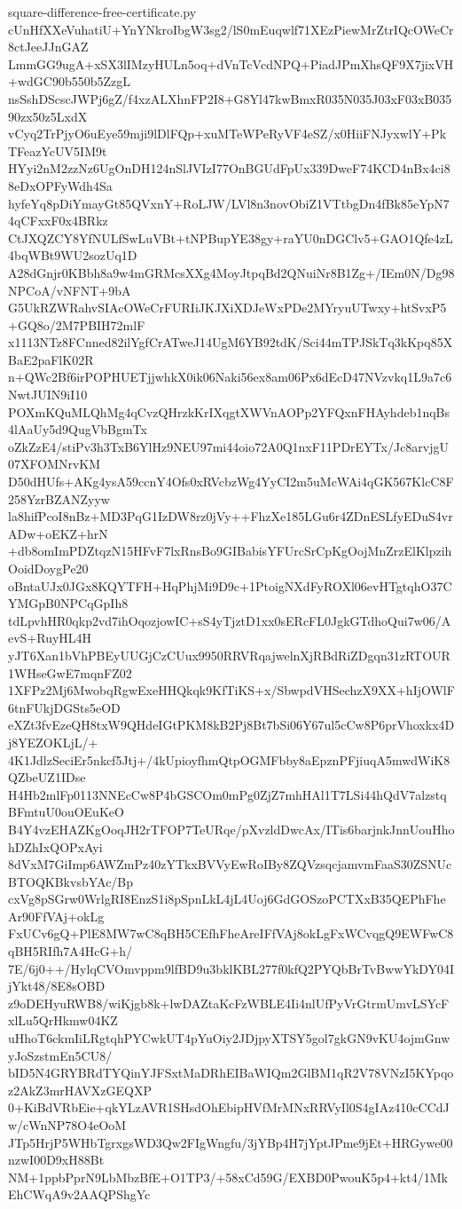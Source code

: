 \documentclass[11pt]{article}
\theoremstyle{definition}
\theoremstyle{remark}
\begin{document}
\begin{filecontents*}[overwrite]{square-difference-free-certificate.py}
cUnHfXXeVuhatiU+YnYNkroIbgW3sg2/lS0mEuqwlf71XEzPiewMrZtrIQcOWeCr8ctJeeJJnGAZ
LmmGG9ugA+xSX3lIMzyHULn5oq+dVnTcVcdNPQ+PiadJPmXhsQF9X7jixVH+wdGC90b550b5ZzgL
nsSshDScscJWPj6gZ/f4xzALXhnFP2I8+G8Yl47kwBmxR035N035J03xF03xB03590zx50z5LxdX
vCyq2TrPjyO6uEye59mji9lDlFQp+xuMTeWPeRyVF4eSZ/x0HiiFNJyxwlY+PkTFeazYcUV5IM9t
HYyi2nM2zzNz6UgOnDH124nSlJVIzI77OnBGUdFpUx339DweF74KCD4nBx4ci88eDxOPFyWdh4Sa
hyfeYq8pDiYmayGt85QVxnY+RoLJW/LVl8n3novObiZ1VTtbgDn4fBk85eYpN74qCFxxF0x4BRkz
CtJXQZCY8YfNULfSwLuVBt+tNPBupYE38gy+raYU0nDGClv5+GAO1Qfe4zL4bqWBt9WU2sozUq1D
A28dGnjr0KBbh8a9w4mGRMcsXXg4MoyJtpqBd2QNuiNr8B1Zg+/IEm0N/Dg98NPCoA/vNFNT+9bA
G5UkRZWRahvSIAcOWeCrFURIiJKJXiXDJeWxPDe2MYryuUTwxy+htSvxP5+GQ8o/2M7PBIH72mlF
x1113NTz8FCnned82ilYgfCrATweJ14UgM6YB92tdK/Sci44mTPJSkTq3kKpq85XBaE2paFlK02R
n+QWc2Bf6irPOPHUETjjwhkX0ik06Naki56ex8am06Px6dEcD47NVzvkq1L9a7c6NwtJUIN9iI10
POXmKQuMLQhMg4qCvzQHrzkKrIXqgtXWVnAOPp2YFQxnFHAyhdeb1nqBs4lAaUy5d9QugVbBgmTx
oZkZzE4/stiPv3h3TxB6YlHz9NEU97mi44oio72A0Q1nxF11PDrEYTx/Jc8arvjgU07XFOMNrvKM
D50dHUfs+AKg4ysA59ccnY4Ofs0xRVcbzWg4YyCI2m5uMcWAi4qGK567KlcC8F258YzrBZANZyyw
la8hifPcoI8nBz+MD3PqG1IzDW8rz0jVy++FhzXe185LGu6r4ZDnESLfyEDuS4vrADw+oEKZ+hrN
+db8omImPDZtqzN15HFvF7lxRnsBo9GIBabisYFUrcSrCpKgOojMnZrzElKlpzihOoidDoygPe20
oBntaUJx0JGx8KQYTFH+HqPhjMi9D9c+1PtoigNXdFyROXl06evHTgtqhO37CYMGpB0NPCqGpIh8
tdLpvhHR0qkp2vd7ihOqozjowIC+sS4yTjztD1xx0sERcFL0JgkGTdhoQui7w06/AevS+RuyHL4H
yJT6Xan1bVhPBEyUUGjCzCUux9950RRVRqajwelnXjRBdRiZDgqn31zRTOUR1WHseGwE7mqnFZ02
1XFPz2Mj6MwobqRgwExeHHQkqk9KfTiKS+x/SbwpdVHSechzX9XX+hIjOWlF6tnFUkjDGSts5eOD
eXZt3fvEzeQH8txW9QHdeIGtPKM8kB2Pj8Bt7bSi06Y67ul5cCw8P6prVhoxkx4Dj8YEZOKLjL/+
4K1JdlzSeciEr5nkcf5Jtj+/4kUpioyfhmQtpOGMFbby8aEpznPFjiuqA5mwdWiK8QZbeUZ1IDse
H4Hb2mlFp0113NNEcCw8P4bGSCOm0mPg0ZjZ7mhHAl1T7LSi44hQdV7alzstqBFmtuU0ouOEuKeO
B4Y4vzEHAZKgOoqJH2rTFOP7TeURqe/pXvzldDwcAx/ITis6barjnkJnnUouHhohDZhIxQOPxAyi
8dVxM7GiImp6AWZmPz40zYTkxBVVyEwRoIBy8ZQVzsqcjamvmFaaS30ZSNUcBTOQKBkvsbYAc/Bp
cxVg8pSGrw0WrlgRI8EnzS1i8pSpnLkL4jL4Uoj6GdGOSzoPCTXxB35QEPhFheAr90FfVAj+okLg
FxUCv6gQ+PlE8MW7wC8qBH5CEfhFheAreIFfVAj8okLgFxWCvqgQ9EWFwC8qBH5RIfh7A4HcG+h/
7E/6j0++/HylqCVOmvppm9lfBD9u3bklKBL277f0kfQ2PYQbBrTvBwwYkDY04IjYkt48/8E8sOBD
z9oDEHyuRWB8/wiKjgb8k+lwDAZtaKcFzWBLE4Ii4nlUfPyVrGtrmUmvLSYcFxlLu5QrHkmw04KZ
uHhoT6ckmIiLRgtqhPYCwkUT4pYuOiy2JDjpyXTSY5gol7gkGN9vKU4ojmGnwyJoSzstmEn5CU8/
bID5N4GRYBRdTYQinYJFSxtMaDRhEIBaWIQm2GlBM1qR2V78VNzI5KYpqoz2AkZ3mrHAVXzGEQXP
0+KiBdVRbEie+qkYLzAVR1SHsdOhEbipHVfMrMNxRRVyIl0S4gIAz410cCCdJw/cWnNP78O4eOoM
JTp5HrjP5WHbTgrxgsWD3Qw2FIgWngfu/3jYBp4H7jYptJPme9jEt+HRGywe00nzwI00D9xH88Bt
NM+1ppbPprN9LbMbzBfE+O1TP3/+58xCd59G/EXBD0PwouK5p4+kt4/1MkEhCWqA9v2AAQPShgYc

\end{filecontents*}
\end{document}
